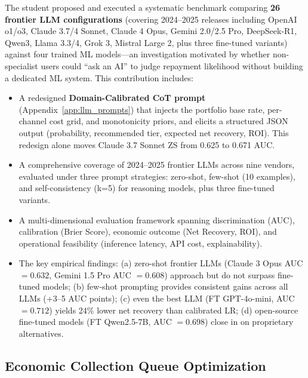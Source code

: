 \documentclass[12pt, a4paper]{article}
\begin{document}
The student proposed and executed a systematic benchmark comparing \textbf{26 frontier LLM configurations} (covering 2024--2025 releases including OpenAI o1/o3, Claude 3.7/4 Sonnet, Claude 4 Opus, Gemini 2.0/2.5 Pro, DeepSeek-R1, Qwen3, Llama 3.3/4, Grok 3, Mistral Large 2, plus three fine-tuned variants) against four trained ML models---an investigation motivated by whether non-specialist users could ``ask an AI'' to judge repayment likelihood without building a dedicated ML system. This contribution includes:
\begin{itemize}[leftmargin=*]
    \item A redesigned \textbf{Domain-Calibrated CoT prompt} (Appendix~\ref{app:llm_prompts}) that injects the portfolio base rate, per-channel cost grid, and monotonicity priors, and elicits a structured JSON output (probability, recommended tier, expected net recovery, ROI). This redesign alone moves Claude 3.7 Sonnet ZS from 0.625 to 0.671 AUC.

    \item A comprehensive coverage of 2024--2025 frontier LLMs across nine vendors, evaluated under three prompt strategies: zero-shot, few-shot (10 examples), and self-consistency (k=5) for reasoning models, plus three fine-tuned variants.
    
    \item A multi-dimensional evaluation framework spanning discrimination (AUC), calibration (Brier Score), economic outcome (Net Recovery, ROI), and operational feasibility (inference latency, API cost, explainability).
    
    \item The key empirical findings: (a) zero-shot frontier LLMs (Claude 3 Opus AUC $= 0.632$, Gemini 1.5 Pro AUC $= 0.608$) approach but do not surpass fine-tuned models; (b) few-shot prompting provides consistent gains across all LLMs (+3--5 AUC points); (c) even the best LLM (FT GPT-4o-mini, AUC $= 0.712$) yields 24\% lower net recovery than calibrated LR; (d) open-source fine-tuned models (FT Qwen2.5-7B, AUC $= 0.698$) close in on proprietary alternatives.
\end{itemize}

\subsection{Economic Collection Queue Optimization}
\end{document}
